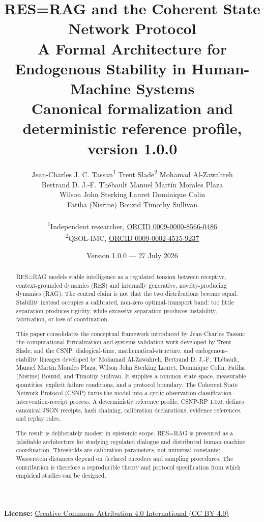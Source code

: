 \documentclass[11pt]{article}
\title{
  \vspace{-1.5cm}
  {\color{resblue}\textbf{RES=RAG and the Coherent State Network Protocol}}\\[4pt]
  \large A Formal Architecture for Endogenous Stability in Human-Machine Systems\\[8pt]
  \normalsize Canonical formalization and deterministic reference profile,
  version 1.0.0
}
\author{
  \small
  \begin{tabular}{c}
  Jean-Charles J. C. Tassan\textsuperscript{1} \quad
  Trent Slade\textsuperscript{2} \quad
  Mohamad Al-Zawahreh\\
  Bertrand D. J.-F. Thébault \quad
  Manuel Martín Morales Plaza\\
  Wilson John Sterking Lauret \quad
  Dominique Colin\\
  Fatiha (Nisrine) Bouzid \quad
  Timothy Sullivan
  \end{tabular}\\[3pt]
  \small
  \textsuperscript{1}Independent researcher,
  \href{https://orcid.org/0009-0000-8566-0486}{ORCID 0009-0000-8566-0486}\\
  \small
  \textsuperscript{2}QSOL-IMC,
  \href{https://orcid.org/0009-0002-4515-9237}{ORCID 0009-0002-4515-9237}
}
\date{Version 1.0.0 --- 27 July 2026}
\begin{document}
\maketitle

\begin{center}
\smallskip

\small
\textbf{License:}
\href{https://creativecommons.org/licenses/by/4.0/}
{Creative Commons Attribution 4.0 International (CC BY 4.0)}
\end{center}

\begin{abstract}
RES=RAG models stable intelligence as a regulated tension between receptive,
context-grounded dynamics (RES) and internally generative,
novelty-producing dynamics (RAG). The central claim is not that the two
distributions become equal. Stability instead occupies a calibrated, non-zero
optimal-transport band: too little separation produces rigidity, while
excessive separation produces instability, fabrication, or loss of
coordination.

This paper consolidates the conceptual framework introduced by Jean-Charles
Tassan; the computational formalization and systems-validation work developed
by Trent Slade; and the CSNP, dialogical-time, mathematical-structure, and
endogenous-stability lineages developed by Mohamad Al-Zawahreh, Bertrand D.
J.-F. Thébault, Manuel Martín Morales Plaza, Wilson John Sterking Lauret,
Dominique Colin, Fatiha (Nisrine) Bouzid, and Timothy Sullivan. It supplies a
common state space, measurable quantities, explicit failure conditions, and a
protocol boundary. The Coherent State Network Protocol (CSNP) turns the model
into a cyclic
observation-classification-intervention-receipt process. A deterministic
reference profile, CSNP-RP 1.0.0, defines canonical JSON receipts, hash
chaining, calibration declarations, evidence references, and replay rules.

The result is deliberately modest in epistemic scope. RES=RAG is presented as
a falsifiable architecture for studying regulated dialogue and distributed
human-machine coordination. Thresholds are calibration parameters, not
universal constants; Wasserstein distances depend on declared encoders and
sampling procedures. The contribution is therefore a reproducible theory and
protocol specification from which empirical studies can be designed.
\end{abstract}
\end{document}

